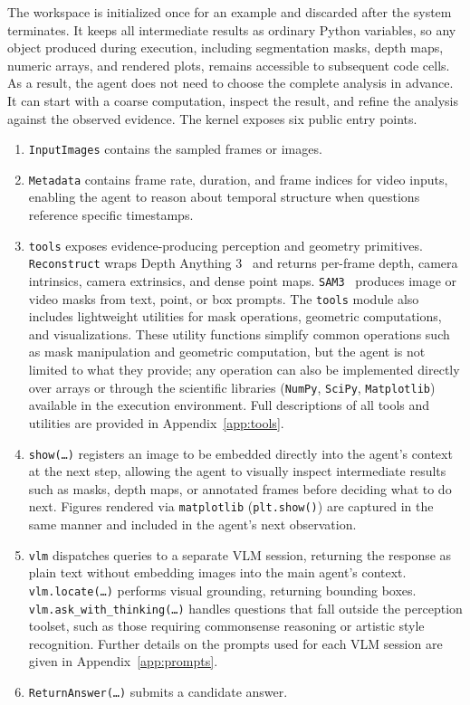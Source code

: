 The workspace is initialized once for an example and discarded after the system terminates.
It keeps all intermediate results as ordinary Python variables, so any object produced during execution, including segmentation masks, depth maps, numeric arrays, and rendered plots, remains accessible to subsequent code cells.
As a result, the agent does not need to choose the complete analysis in advance.
It can start with a coarse computation, inspect the result, and refine the analysis against the observed evidence. The kernel exposes six public entry points.
\begin{enumerate}[leftmargin=2em, itemsep=1pt, topsep=1pt]
    \item \texttt{InputImages} contains the sampled frames or images.
    \item \texttt{Metadata} contains frame rate, duration, and frame indices for video inputs, enabling the agent to reason about temporal structure when questions reference specific timestamps.
    \item \texttt{tools} exposes evidence-producing perception and geometry primitives.
    \texttt{Reconstruct} wraps Depth Anything 3~\citep{depthanything3} and returns per-frame depth, camera intrinsics, camera extrinsics, and dense point maps.
    \texttt{SAM3}~\citep{carion2025sam} produces image or video masks from text, point, or box prompts.
    The \texttt{tools} module also includes lightweight utilities for mask operations, geometric computations, and visualizations.
    These utility functions simplify common operations such as mask manipulation and geometric computation, but the agent is not limited to what they provide; any operation can also be implemented directly over arrays or through the scientific libraries (\texttt{NumPy}, \texttt{SciPy}, \texttt{Matplotlib}) available in the execution environment. Full descriptions of all tools and utilities are provided in Appendix~\ref{app:tools}.
    \item \texttt{show(\ldots)} registers an image to be embedded directly into the agent's context at the next step, allowing the agent to visually inspect intermediate results such as masks, depth maps, or annotated frames before deciding what to do next. Figures rendered via \texttt{matplotlib} (\texttt{plt.show()}) are captured in the same manner and included in the agent's next observation.
    \item \texttt{vlm} dispatches queries to a separate VLM session, returning the response as plain text without embedding images into the main agent's context.
    \texttt{vlm.locate(\ldots)} performs visual grounding, returning bounding boxes.
    \texttt{vlm.ask\_with\_thinking(\ldots)} handles questions that fall outside the perception toolset, such as those requiring commonsense reasoning or artistic style recognition. 
    Further details on the prompts used for each VLM session are given in Appendix~\ref{app:prompts}.
    \item \texttt{ReturnAnswer(\ldots)} submits a candidate answer.
\end{enumerate}
